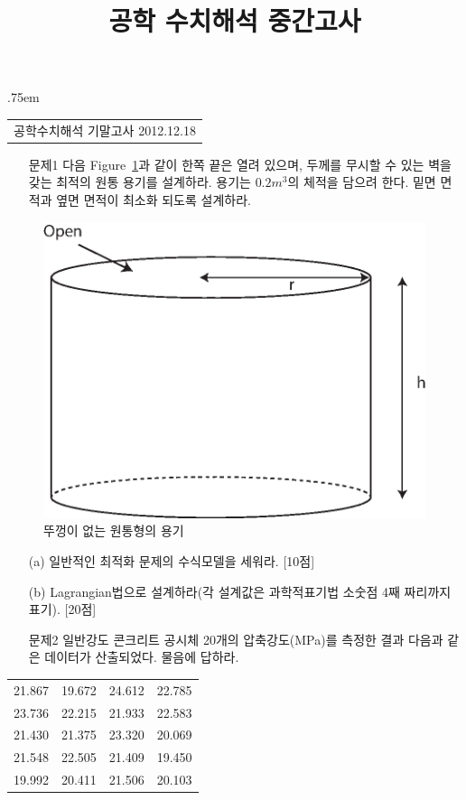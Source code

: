\documentclass[a4,10pt]{article}
\title{공학 수치해석 중간고사}
\author{}
\makeatletter
\theoremstyle{examplestyle}
\let\\\tabularnewline
\let\\\tabularnewline
\renewcommand{\tableofcontents}[1][\contentsname]{%
  \section*{#1}
  \begin{multicols}{2}
    \@starttoc{toc}
  \end{multicols}
}
\makeatother
\begin{document}
\begin{center}
{\lineskip .75em\begin{tabular}[t]{c}\LARGE{공학수치해석 기말고사} \large{2012.12.18}\end{tabular}\par}%
\end{center}

\begin{itemize}
\item[문제1] 다음 Figure~\ref{fig:prob1}과 같이 한쪽 끝은 열려 있으며, 두께를 무시할 수 있는 벽을 갖는 최적의 원통 용기를 설계하라. 용기는 $0.2m^{3}$의 체적을 담으려 한다. 밑면 면적과 옆면 면적이 최소화 되도록 설계하라.
\end{itemize}
\begin{figure}[!hbpt]
\centering
\includegraphics[keepaspectratio=true,width=0.4\linewidth]{finalterm/prob1.eps}
\caption{뚜껑이 없는 원통형의 용기}
\label{fig:prob1}
\end{figure}
\begin{itemize}
\item[(a)] 일반적인 최적화 문제의 수식모델을 세워라. [10점]
\item[(b)] Lagrangian법으로 설계하라(각 설계값은 과학적표기법 소숫점 4째 짜리까지 표기). [20점]
\end{itemize}
\begin{itemize}
\item[문제2] 일반강도 콘크리트 공시체 20개의 압축강도(MPa)를 측정한 결과 다음과 같은 데이터가 산출되었다. 물음에 답하라.
\end{itemize}
\begin{table}[!hbt]
\centering
\begin{tabular}{llll}
\hline\hline
21.867&19.672&24.612&22.785\\
23.736&22.215&21.933&22.583\\
21.430&21.375&23.320&20.069\\
21.548&22.505&21.409&19.450\\
19.992&20.411&21.506&20.103\\
\hline\hline
\end{tabular}
\end{table}
\end{document}
